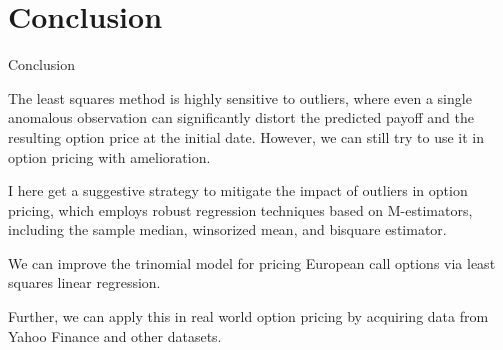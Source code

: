 \documentclass[aspectratio=169,xcolor=dvipsnames]{beamer}
\begin{document}
\section{Conclusion}
\begin{frame}{Conclusion}
	
	The least squares method is highly sensitive to outliers, where even a single anomalous observation can significantly distort the predicted payoff and the resulting option price at the initial date. However, we can still try to use it in option pricing with amelioration.
	
	I here get a suggestive strategy to mitigate the impact of outliers in option pricing, which employs robust regression techniques based on M-estimators, including the sample median, winsorized mean, and bisquare estimator. 
	
	We can improve the trinomial model for pricing European call options via least squares linear regression.
	
	Further, we can apply this in real world option pricing by acquiring data from Yahoo Finance and other datasets. 

\end{frame}
\end{document}
